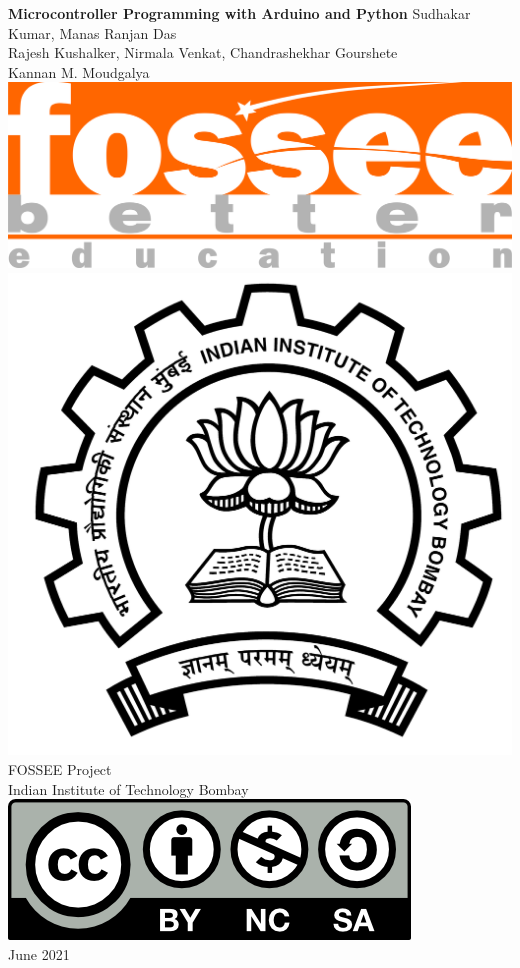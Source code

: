 \begin{center}
    {\bf {\Huge Microcontroller Programming with Arduino and Python}}
    \vfill
    Sudhakar Kumar, Manas Ranjan Das \\
    Rajesh Kushalker, Nirmala Venkat, Chandrashekhar Gourshete \\
    Kannan M. Moudgalya \\
    \vfill
    \includegraphics[width=0.3\linewidth]{suppl/fossee_logo_hi.png} \quad
    \includegraphics[width=0.2\linewidth]{suppl/IITB-logo-HighRes.png} \\
    FOSSEE Project \\
    Indian Institute of Technology Bombay \\ [2mm]
    \includegraphics[width=0.15\linewidth]{suppl/by-nc-sa.png} \\ [1mm]
    June 2021
\end{center}

\clearpage
